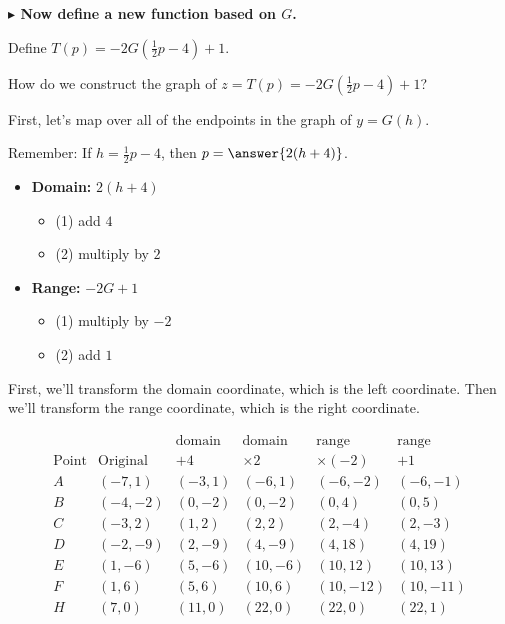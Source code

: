 \documentclass{ximera}
\begin{document}
\begin{example}
\textbf{\textcolor{blue!55!black}{$\blacktriangleright$ Now define a new function based on $G$.}}






Define  $T(p) = -2G\left( \frac{1}{2} p - 4 \right) + 1$.


How do we construct the graph of $z = T(p) = -2G\left(\frac{1}{2} p - 4\right) + 1$?

First, let's map over all of the endpoints in the graph of $y = G(h)$.

Remember: If  $h = \frac{1}{2} p - 4$, then $p = \answer{2(h+4)}$.

\begin{itemize}
 \item \textbf{Domain:}  $2 (h+4)$ 
    \begin{itemize}
      \item (1) add $4$
      \item (2) multiply by $2$
    \end{itemize}

 \item \textbf{Range:}  $-2 G + 1$ 
    \begin{itemize}
      \item (1) multiply by $-2$
      \item (2) add $1$
    \end{itemize}
\end{itemize}


First, we'll transform the domain coordinate, which is the left coordinate.  Then we'll transform the range coordinate, which is the right coordinate.




\[
\begin{array}{c|l|l|l|l|l}
        &         &  \text{domain}  &  \text{domain}    &  \text{range}   & \text{range}         \\
\text{Point}    &  \text{Original}  &  +4           &  \times2   &  \times(-2)  & + 1          \\
\hline
A   &   (-7, 1)          &  (-3, 1)      &  (-6, 1)     &  (-6, -2)    &  (-6,-1)     \\
B   &   (-4, -2)         &  (0, -2)      &  (0, -2)     &  (0,4)      &  (0,5)       \\
C   &   (-3,2)           &  (1,2)        &  (2,2)       &  (2,-4)     &  (2,-3)     \\
D   &   (-2,-9)          &  (2, -9)      &  (4,-9)      &  (4, 18)    &  (4,19)      \\
E   &   (1,-6)           &  (5,-6)       &  (10,-6)     &  (10,12)    &  (10,13)     \\
F   &   (1,6)            &  (5, 6)       &  (10,6)      &  (10,-12)   &  (10,-11)   \\
H   &   (7,0)            &  (11,0)       &  (22,0)      &  (22,0)     &  (22,1)
\end{array}
\]





\end{example}
\end{document}
